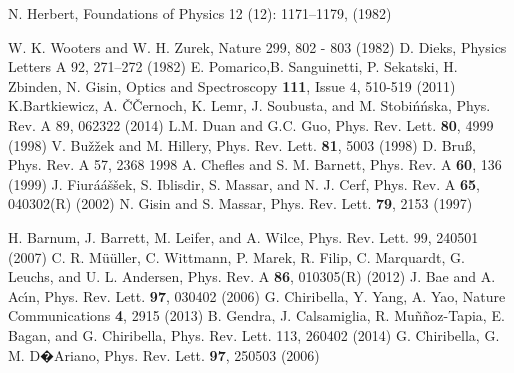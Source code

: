 \documentclass[aps,prl,twocolumn,showpacs]{revtex4}
\begin{document}
\begin{thebibliography}{99}

 N. Herbert, Foundations of Physics 12 (12): 1171–1179,  (1982)

 W. K. Wooters and W. H. Zurek, Nature 299, 802 - 803 (1982)
 D. Dieks, Physics Letters A 92, 271–272  (1982)
 E. Pomarico,B. Sanguinetti, P. Sekatski, H. Zbinden, N. Gisin, Optics and Spectroscopy \textbf{111}, Issue 4, 510-519 (2011)
 K.Bartkiewicz, A. {\v C}Černoch, K. Lemr, J. Soubusta, and M. Stobi{\' n}ńska, Phys. Rev. A 89, 062322 (2014)
 L.M. Duan and G.C. Guo, Phys. Rev. Lett. \textbf{80}, 4999  (1998)
 V. Bu{\v z}žek and M. Hillery, Phys. Rev. Lett. \textbf{81}, 5003 (1998)
 D. Bru{\ss}, Phys. Rev. A 57, 2368  { 1998}
 A. Chefles and S. M. Barnett, Phys. Rev. A \textbf{60}, 136  (1999)
 J. Fiur{\' a}á{\v s}šek, S. Iblisdir, S. Massar, and N. J. Cerf, Phys. Rev. A \textbf{65}, 040302(R) (2002)
N. Gisin and S. Massar, Phys. Rev. Lett. \textbf{79}, 2153 (1997)

 H. Barnum, J. Barrett, M. Leifer, and A. Wilce, Phys. Rev. Lett. 99, 240501 (2007)
 C. R. M{\" u}üller, C. Wittmann, P. Marek, R. Filip, C. Marquardt, G. Leuchs, and U. L. Andersen, Phys. Rev. A \textbf{86}, 010305(R) (2012)
 J. Bae and A. Ac\'{\i}n, Phys. Rev. Lett. \textbf{97}, 030402 (2006)
 G. Chiribella, Y. Yang, A. Yao, Nature Communications \textbf{4},  2915 (2013)
  B. Gendra, J. Calsamiglia, R. Mu{\~ n}ñoz-Tapia, E. Bagan, and G. Chiribella, Phys. Rev. Lett. 113, 260402 (2014)
 G. Chiribella, G. M. D�Ariano, Phys. Rev. Lett. \textbf{97}, 250503 (2006)


\end{thebibliography}
\end{document}
